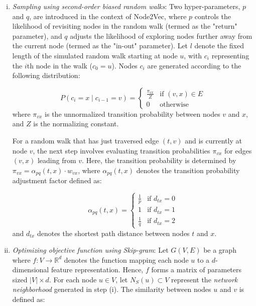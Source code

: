 \begin{enumerate}[(i)]
    \item \textit{Sampling using second-order biased random walks}: Two hyper-parameters, \( p \) and \( q \), are introduced in the context of Node2Vec, where \( p \) controls the likelihood of revisiting nodes in the random walk (termed as the "return" parameter), and \( q \) adjusts the likelihood of exploring nodes further away from the current node (termed as the "in-out" parameter). Let \( l \) denote the fixed length of the simulated random walk starting at node \( u \), with \( c_i \) representing the \( i \)th node in the walk (\( c_0 = u \)). Nodes \( c_i \) are generated according to the following distribution:

    \[
        P(c_i = x \mid c_{i-1} = v) =
        \begin{cases}
        \frac{\pi_{vx}}{Z} & \text{if } (v,x) \in E \\
        0 & \text{otherwise}
        \end{cases}
    \]
    where \( \pi_{vx} \) is the unnormalized transition probability between nodes \( v \) and \( x \), and \( Z \) is the normalizing constant.
    
    For a random walk that has just traversed edge \( (t,v) \) and is currently at node \( v \), the next step involves evaluating transition probabilities \( \pi_{vx} \) for edges \( (v,x) \) leading from \( v \). Here, the transition probability is determined by \( \pi_{vx} = \alpha_{pq}(t,x) \cdot w_{vx} \), where \( \alpha_{pq}(t,x) \) denotes the transition probability adjustment factor defined as:

    \[
        \alpha_{pq}(t,x) = 
        \begin{cases}
        \frac{1}{p}  & \text{if } d_{tx} = 0\\
        1 & \text{if } d_{tx} = 1\\
        \frac{1}{q} & \text{if } d_{tx} = 2
        \end{cases}
    \]
    and \( d_{tx} \) denotes the shortest path distance between nodes \( t \) and \( x \).

    \item \textit{Optimizing objective function using Skip-gram}: Let \( G(V, E) \) be a graph where \( f: V \rightarrow \mathbb{R}^d \) denotes the function mapping each node \( u \) to a \( d \)-dimensional feature representation. Hence, \( f \) forms a matrix of parameters sized \( |V| \times d \). For each node \( u \in V \), let \( N_S(u) \subset V \) represent the \emph{network neighborhood} generated in step (i). The similarity between nodes \( u \) and \( v \) is defined as:


\end{enumerate}
